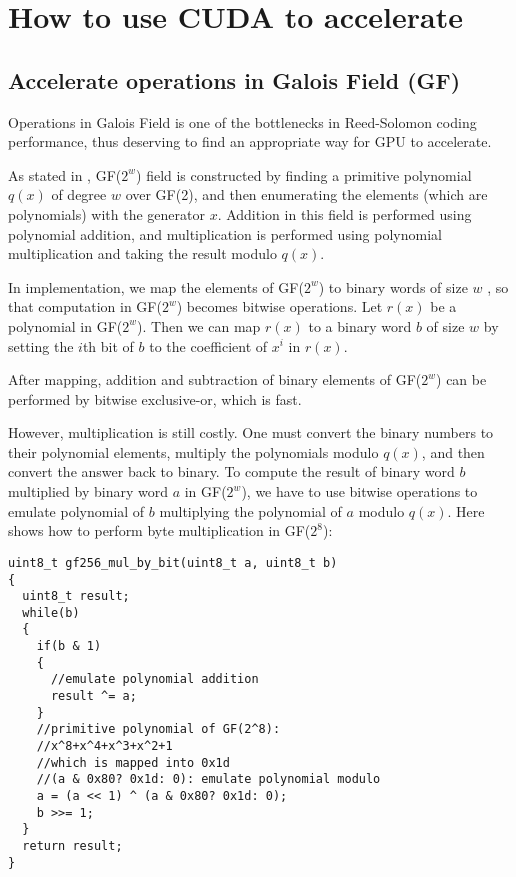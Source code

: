 \documentclass[a4paper]{article}
\begin{document}
\section{How to use CUDA to accelerate}

\subsection{Accelerate operations in Galois Field (GF)}


Operations in Galois Field is one of the bottlenecks in Reed-Solomon coding performance, thus deserving to find an appropriate way for GPU to accelerate.

As stated in \cite{sklar2001reed},
GF($2^w$) field is constructed by finding a primitive polynomial $q(x)$ of degree $w$ over GF(2), and then enumerating the elements (which are polynomials) with the generator $x$.
Addition in this field is performed using polynomial addition, and multiplication is performed using polynomial multiplication and taking the result modulo $q(x)$.

In implementation, we
map the elements of GF($2^w$) to binary words of size $w$
, so that computation in GF($2^w$) becomes bitwise operations.
Let $r(x)$ be a polynomial in GF($2^w$). Then we can map $r(x)$ to a binary word $b$ of size $w$ by setting the $i$th bit of $b$ to the coefficient of $x^i$ in $r(x)$.


After mapping, 
addition and subtraction of binary elements of GF($2^w$) can be performed by bitwise exclusive-or, which is fast. 

However, multiplication 
is still costly.
%
One must convert the binary numbers to their polynomial
elements, multiply the polynomials modulo $q(x)$, and then convert the answer back to binary.
To compute the result of binary word $b$ multiplied by binary word $a$ in GF($2^w$),
we have to use bitwise operations to emulate polynomial of $b$ multiplying the polynomial of $a$ modulo $q(x)$.
Here shows how to perform byte multiplication in GF($2^8$):
\begin{verbatim}
uint8_t gf256_mul_by_bit(uint8_t a, uint8_t b)
{
  uint8_t result;
  while(b)
  {
    if(b & 1)
    {
      //emulate polynomial addition
      result ^= a;
    }
    //primitive polynomial of GF(2^8):
    //x^8+x^4+x^3+x^2+1
    //which is mapped into 0x1d
    //(a & 0x80? 0x1d: 0): emulate polynomial modulo
    a = (a << 1) ^ (a & 0x80? 0x1d: 0);
    b >>= 1;
  }
  return result;
}
\end{verbatim}
\end{document}
